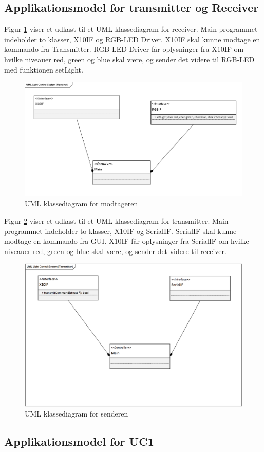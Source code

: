 \documentclass[oneside]{memoir}
\begin{document}
\subsection{Applikationsmodel for transmitter og Receiver}
Figur \ref{fig:UMLdiagram} viser et udkast til et UML klassediagram for receiver. Main programmet indeholder to klasser, X10IF og RGB-LED Driver. X10IF skal kunne modtage en kommando fra Transmitter. RGB-LED Driver får oplysninger fra X10IF om hvilke niveauer red, green og blue skal være, og sender det videre til RGB-LED med funktionen setLight. 

\begin{figure}[H]
\centering
\includegraphics[width=0.6\linewidth]{"billeder til latex/UMLdiagram"}
\caption{UML klassediagram for modtageren}
\label{fig:UMLdiagram}
\end{figure}

Figur \ref{fig:UMLtransmitter} viser et udkast til et UML klassediagram for transmitter. Main programmet indeholder to klasser, X10IF og SerialIF. SerialIF skal kunne modtage en kommando fra GUI. X10IF får oplysninger fra SerialIF om hvilke niveauer red, green og blue skal være, og sender det videre til receiver. 
\begin{figure}[H]
\centering
\includegraphics[width=0.6\linewidth]{"billeder til latex/UMLtransmitter"}
\caption{UML klassediagram for senderen}
\label{fig:UMLtransmitter}
\end{figure}



\newpage

\newpage
\subsection{Applikationsmodel for UC1}
\end{document}
